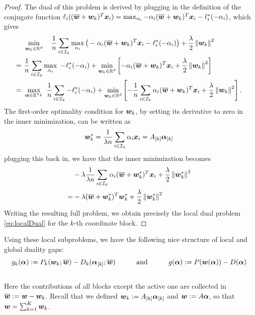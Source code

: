 \documentclass{article} %
\begin{document}
\begin{proof}
The dual of this problem is derived by plugging in the definition of the conjugate function $\ell_i( (\overline{{\bm{w}}}+{\bm{w}}_k)^T \bm{x}_i ) = \max_{\alpha_i} -\alpha_i (\overline{{\bm{w}}}+{\bm{w}}_k)^T \bm{x}_i - \ell^*_i(-\alpha_i)$, which gives
\begin{align*}
 & \min_{{\bm{w}}_k \in\mathbb{R}^d} \quad \frac1{n} 
                       \sum_{i\in\mathcal{I}_k} \max_{\alpha_i} \big( -\alpha_i (\overline{{\bm{w}}}+{\bm{w}}_k)^T \bm{x}_i - \ell^*_i(-\alpha_i) \big)  
                       + \frac{\lambda}{2}\left\lVert{\bm{w}}_k\right\rVert^2    \\
= \ &  \frac1{n}   \sum_{i\in\mathcal{I}_k} \max_{\alpha_i} \ - \ell^*_i(-\alpha_i) + \min_{{\bm{w}}_k \in\mathbb{R}^d} \left[ -\alpha_i (\overline{{\bm{w}}}+{\bm{w}}_k)^T \bm{x}_i
                       + \frac{\lambda}{2}\left\lVert{\bm{w}}_k\right\rVert^2  \right]    \\
= \ &  \max_{\bm{\alpha}\in\mathbb{R}^{n_k}}\  \frac1{n}   \sum_{i\in\mathcal{I}_k} - \ell^*_i(-\alpha_i) + \min_{{\bm{w}}_k \in\mathbb{R}^d} \left[ - \frac1{n} \sum_{i\in\mathcal{I}_k} \alpha_i (\overline{{\bm{w}}}+{\bm{w}}_k)^T \bm{x}_i
                       + \frac{\lambda}{2}\left\lVert{\bm{w}}_k\right\rVert^2  \right] .
\end{align*}
The first-order optimality condition for ${\bm{w}}_k$, by setting its derivative to zero in the inner minimization, can be written as
\[
{\bm{w}}_k^* =  \frac1{\lambda n}   \sum_{i\in\mathcal{I}_k} \alpha_i \bm{x}_i  = A_{[k]} \bm{\alpha}_{[k]}
\]
plugging this back in, we have that the inner minimization becomes
\begin{align*}
 & -\lambda \frac1{\lambda n}   \sum_{i\in\mathcal{I}_k} \alpha_i (\overline{{\bm{w}}}+{\bm{w}}_k^*)^T \bm{x}_i   + \frac{\lambda}{2}\left\lVert{\bm{w}}_k^* \right\rVert^2  \\
=& -\lambda (\overline{{\bm{w}}}+{\bm{w}}_k^*)^T{\bm{w}}_k^* + \frac{\lambda}{2}\left\lVert{\bm{w}}_k^* \right\rVert^2
\end{align*}
Writing the resulting full problem, we obtain precisely the local dual problem \eqref{eq:localDual} for the $k$-th coordinate block.
\end{proof}

Using these local subproblems, we have the following nice structure of local and global duality gaps: \\
\[
g_k(\bm{\alpha}) := P_k({\bm{w}}_k;\overline{{\bm{w}}})-D_k(\bm{\alpha}_{[k]};\overline{{\bm{w}}})
~~~~~~~~\text{ and }~~~~~~~~
g(\bm{\alpha}) := P({\bm{w}}(\bm{\alpha}))-D(\bm{\alpha})
\] \\
Here the contributions of all blocks except the active one are collected in $\overline{{\bm{w}}} := {\bm{w}} - {\bm{w}}_k$. Recall that we defined ${\bm{w}}_k := A_{[k]}\bm{\alpha}_{[k]}$ and ${\bm{w}} := A\bm{\alpha}$, so that ${\bm{w}} = \sum_{k=1}^K {\bm{w}}_k$.
 
\end{document}

